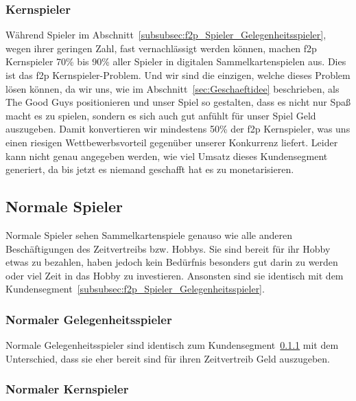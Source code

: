 \documentclass[fontsize=12, a4aper]{scrartcl}
\begin{document}
\subsubsection{Kernspieler} \label{subsubsec:f2p_Spieler_Kernspieler}

Während Spieler im Abschnitt~\ref{subsubsec:f2p_Spieler_Gelegenheitsspieler}, wegen ihrer geringen Zahl, fast vernachlässigt werden können, machen \ac{f2p} Kernspieler 70\% bis 90\% aller Spieler in digitalen Sammelkartenspielen aus. Dies ist das \glqq \acl{f2p} Kernspieler-Problem\grqq. Und wir sind die einzigen, welche dieses Problem lösen können, da wir uns, wie im Abschnitt~\ref{sec:Geschaeftidee} beschrieben, als \glqq The Good Guys\grqq{} positionieren und unser Spiel so gestalten, dass es nicht nur Spaß macht es zu spielen, sondern es sich auch gut anfühlt für unser Spiel Geld auszugeben. Damit konvertieren wir mindestens 50\% der \ac{f2p} Kernspieler, was uns einen riesigen Wettbewerbsvorteil gegenüber unserer Konkurrenz liefert. Leider kann nicht genau angegeben werden, wie viel Umsatz dieses Kundensegment generiert, da bis jetzt es niemand geschafft hat es zu monetarisieren.

\subsection{Normale Spieler} \label{subsec:Normale_Spieler}

Normale Spieler sehen Sammelkartenspiele genauso wie alle anderen Beschäftigungen des Zeitvertreibs bzw. Hobbys. Sie sind bereit für ihr Hobby etwas zu bezahlen, haben jedoch kein Bedürfnis besonders gut darin zu werden oder viel Zeit in das Hobby zu investieren. Ansonsten sind sie identisch mit dem Kundensegment~\ref{subsubsec:f2p_Spieler_Gelegenheitsspieler}.

\subsubsection{Normaler Gelegenheitsspieler} \label{subsubsec:Normaler_Gelegenheitsspieler}

Normale Gelegenheitsspieler sind identisch zum Kundensegment~\ref{subsubsec:Normaler_Gelegenheitsspieler} mit dem Unterschied, dass sie eher bereit sind für ihren Zeitvertreib Geld auszugeben.

\subsubsection{Normaler Kernspieler} \label{subsubsec:Normaler_Kernspieler}
\end{document}
